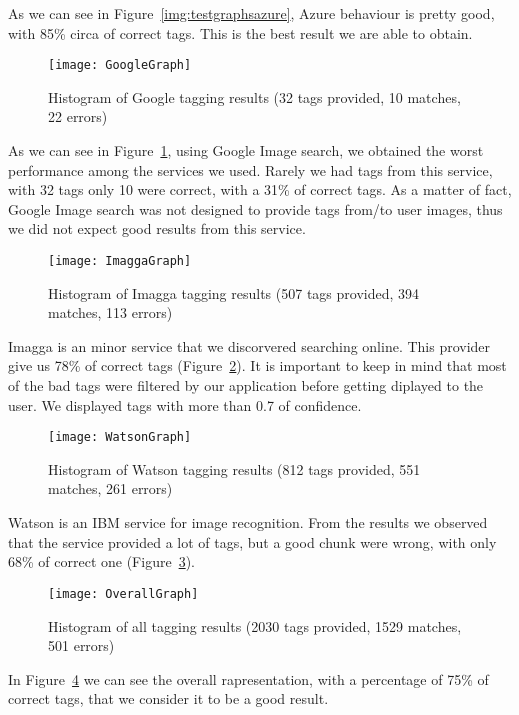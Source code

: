 As we can see in Figure~\ref{img:testgraphsazure}, Azure behaviour is pretty good, with 85\% circa of correct tags. This is the best result we are able to obtain.

\begin{figure}[H]
\centering
\texttt{[image: GoogleGraph]}
\caption{Histogram of Google tagging results (32 tags provided, 10 matches, 22 errors)}
\label{img:testgraphgoogle}
\end{figure}

As we can see in Figure~\ref{img:testgraphgoogle}, using Google Image search, we obtained the worst performance among the services we used. Rarely we had tags from this service, with 32 tags only 10 were correct, with a 31\% of correct tags. As a matter of fact, Google Image search was not designed to provide tags from/to user images, thus we did not expect good results from this service.

\begin{figure}[H]
\centering
\texttt{[image: ImaggaGraph]}
\caption{Histogram of Imagga tagging results (507 tags provided, 394 matches, 113 errors)}
\label{img:testgraphimagga}
\end{figure}

Imagga is an minor service that we discorvered searching online. This provider give us 78\% of correct tags (Figure~\ref{img:testgraphimagga}). It is important to keep in mind that most of the bad tags were filtered by our application before getting diplayed to the user. We displayed tags with more than 0.7 of confidence.

\begin{figure}[H]
\centering
\texttt{[image: WatsonGraph]}
\caption{Histogram of Watson tagging results (812 tags provided, 551 matches, 261 errors)}
\label{img:testgraphwatson}
\end{figure}

Watson is an IBM service for image recognition. From the results we observed that the service provided a lot of tags, but a good chunk were wrong, with only 68\% of correct one (Figure~\ref{img:testgraphwatson}).

\begin{figure}[H]
\centering
\texttt{[image: OverallGraph]}
\caption{Histogram of all tagging results (2030 tags provided, 1529 matches, 501 errors)}
\label{img:testgraphoverall}
\end{figure}

In Figure~\ref{img:testgraphoverall} we can see the overall rapresentation, with a percentage of 75\% of correct tags, that we consider it to be a good result.

